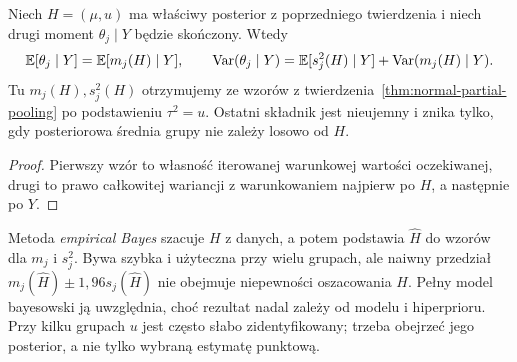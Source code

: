 \begin{stwierdzenie}
\label{prop:hier-variance-hyper}
Niech $H=(\mu,u)$ ma właściwy posterior z poprzedniego
twierdzenia i niech drugi moment $\theta_j\mid Y$ będzie skończony.
Wtedy
\[
 \mathbb E[\theta_j\mid Y]=\mathbb E[m_j(H)\mid Y],\qquad
 \operatorname{Var}(\theta_j\mid Y)=\mathbb E[s_j^2(H)\mid Y]
                       +\operatorname{Var}(m_j(H)\mid Y).
\]
Tu $m_j(H),s_j^2(H)$ otrzymujemy ze wzorów
z twierdzenia~\ref{thm:normal-partial-pooling} po podstawieniu
$\tau^2=u$. Ostatni składnik jest nieujemny i znika tylko,
gdy posteriorowa średnia grupy nie zależy losowo od $H$.
\end{stwierdzenie}
\begin{proof}
Pierwszy wzór to własność iterowanej warunkowej wartości
oczekiwanej, drugi to prawo całkowitej wariancji
z warunkowaniem najpierw po $H$, a następnie po $Y$.
\end{proof}

\begin{uwaga}
Metoda \emph{empirical Bayes} szacuje $H$ z danych, a potem
podstawia $\widehat H$ do wzorów dla $m_j$ i $s_j^2$.
Bywa szybka i użyteczna przy wielu grupach, ale naiwny
przedział $m_j(\widehat H)\pm1{,}96s_j(\widehat H)$
nie obejmuje niepewności oszacowania $H$. Pełny model
bayesowski ją uwzględnia, choć rezultat nadal zależy od
modelu i hiperprioru. Przy kilku grupach $u$ jest często
słabo zidentyfikowany; trzeba obejrzeć jego posterior,
a nie tylko wybraną estymatę punktową.
\end{uwaga}

